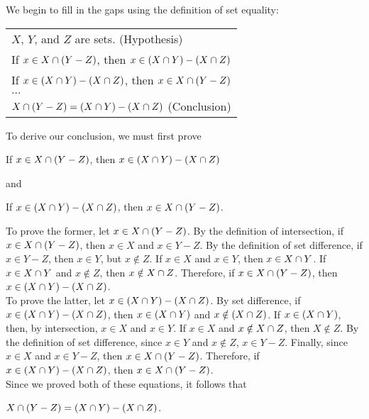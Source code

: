 We begin to fill in the gaps using the definition of set equality:

\begin{table}[h]
\centering
\begin{tabular}{l}
$X$, $Y$, and $Z$ are sets. (Hypothesis)\\
If $x \in X \cap (Y - Z)$, then $x \in (X \cap Y) - (X \cap Z)$\\
If $x \in (X \cap Y) - (X \cap Z)$, then $x \in X \cap (Y - Z)$\\
$\dots$\\
$X \cap (Y - Z) = (X \cap Y) - (X \cap Z)$ (Conclusion)
\end{tabular}
\end{table}

To derive our conclusion, we must first prove
\begin{center}
    If $x \in X \cap (Y - Z)$, then $x \in (X \cap Y) - (X \cap Z)$
\end{center}

and 
\begin{center}
    If $x \in (X \cap Y) - (X \cap Z)$, then $x \in X \cap (Y - Z)$.
\end{center}

To prove the former, let $x \in X \cap (Y - Z)$.  By the definition of intersection, if $x \in X \cap (Y - Z)$, then $x \in X$ and $x \in Y - Z$.  By the definition of set difference, if $x \in Y - Z$, then $x \in Y$, but $x \notin Z$.  If $x \in X$ and $x \in Y$, then $x \in X \cap Y$.  If $x \in X \cap Y$ and $x \notin Z$, then $x \notin X \cap Z$.  Therefore, if $x \in X \cap (Y - Z)$, then $x \in (X \cap Y) - (X \cap Z)$.\\

To prove the latter, let $x \in (X \cap Y) - (X \cap Z)$.  By set difference, if $x \in (X \cap Y) - (X \cap Z)$, then $x \in (X \cap Y)$ and $x \notin (X \cap Z)$.  If $x \in (X \cap Y)$, then, by intersection, $x \in X$ and $x \in Y$.  If $x \in X$ and $x \notin X \cap Z$, then $X \notin Z$.  By the definition of set difference, since $x \in Y$ and $x \notin Z$, $x \in Y - Z$.  Finally, since $x \in X$ and $x \in Y - Z$, then $x \in X \cap (Y - Z)$.  Therefore, if $x \in (X \cap Y) - (X \cap Z)$, then $x \in X \cap (Y - Z)$.\\

Since we proved both of these equations, it follows that

\begin{center}
    $X \cap (Y - Z) = (X \cap Y) - (X \cap Z)$.
\end{center}